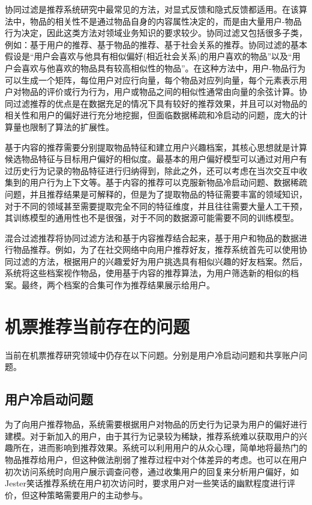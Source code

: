 协同过滤是推荐系统研究中最常见的方法，对显式反馈和隐式反馈都适用。在该算法中，物品的相关性不是通过物品自身的内容属性决定的，而是由大量用户-物品行为决定，因此这类方法对领域业务知识的要求较少。协同过滤又包括很多子类，例如：基于用户的推荐\cite{babu2011implementation}、基于物品的推荐\cite{sarwar2001item,linden2003amazon}、基于社会关系的推荐\cite{asabere2015socially,massa2007trust}。协同过滤的基本假设是“用户会喜欢与他具有相似偏好(相近社会关系)的用户喜欢的物品”以及“用户会喜欢与他喜欢的物品具有较高相似性的物品”。在这种方法中，用户-物品行为可以生成一个矩阵，每位用户对应行向量，每个物品对应列向量，每个元素表示用户对物品的评价或行为行为，用户或物品之间的相似性通常由向量的余弦\cite{goshtasby2012similarity}计算。协同过滤推荐的优点是在数据充足的情况下具有较好的推荐效果，并且可以对物品的相关性和用户的偏好进行充分地挖掘，但面临数据稀疏和冷启动的问题，庞大的计算量也限制了算法的扩展性。

基于内容的推荐需要分别提取物品特征和建立用户兴趣档案，其核心思想就是计算候选物品特征与目标用户偏好的相似度。最基本的用户偏好模型可以通过对用户有过历史行为记录的物品特征进行归纳得到，除此之外，还可以考虑在当次交互中收集到的用户行为上下文等。基于内容的推荐可以克服新物品冷启动问题、数据稀疏问题，并且推荐结果是可解释的，但是为了提取物品的特征需要丰富的领域知识，对于不同的领域甚至需要提取完全不同的特征维度，并且往往需要大量人工干预，其训练模型的通用性也不是很强，对于不同的数据源可能需要不同的训练模型。

混合过滤推荐将协同过滤方法和基于内容推荐结合起来，基于用户和物品的数据进行物品推荐。例如，为了在社交网络中向用户推荐好友\cite{portugal2015use}，推荐系统首先可以使用协同过滤的方法，根据用户的兴趣爱好为用户挑选具有相似兴趣的好友档案。然后，系统将这些档案视作物品，使用基于内容的推荐算法，为用户筛选新的相似的档案。最终，两个档案的合集可作为推荐结果展示给用户。

\section{机票推荐当前存在的问题}

当前在机票推荐研究领域中仍存在以下问题。分别是用户冷启动问题\cite{schein2002methods}和共享账户问题\cite{weston2013nonlinear}。

\subsection{用户冷启动问题}

为了向用户推荐物品，系统需要根据用户对物品的历史行为记录为用户的偏好进行建模。对于新加入的用户，由于其行为记录较为稀缺，推荐系统难以获取用户的兴趣所在，进而影响到推荐效果。系统可以利用用户的从众心理，简单地将最热门\cite{sun2012survey}的物品推荐给用户，但这种做法削弱了推荐过程中对个体差异的考虑。也可以在用户初次访问系统时向用户展示调查问卷，通过收集用户的回复来分析用户偏好，如Jester\cite{goldberg2001eigentaste}笑话推荐系统在用户初次访问时，要求用户对一些笑话的幽默程度进行评价，但这种策略需要用户的主动参与。

